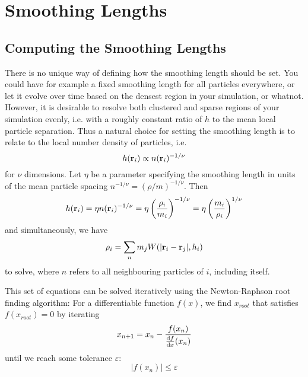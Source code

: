 \newpage
\section{Smoothing Lengths}\label{chap:smoothing_length}


\subsection{Computing the Smoothing Lengths}



There is no unique way of defining how the smoothing length should be set.
You could have for example a fixed smoothing length for all particles everywhere, or let it evolve over time based on the densest region in your simulation, or whatnot.
However, it is desirable to resolve both clustered and sparse regions of your simulation evenly, i.e. with a roughly constant ratio of $h$ to the mean local particle separation.
Thus a natural choice for setting the smoothing length is to relate to the local number density of particles, i.e.
\begin{equation}
	h(\mathbf{r}_i) \propto n(\mathbf{r}_i) ^ {-1/\nu}
\end{equation}
for $\nu$ dimensions.
Let $\eta$ be a parameter specifying the smoothing length in units of the mean particle spacing $n ^ {-1/\nu} = (\rho/m) ^ {-1/\nu}$.
Then
\begin{equation}
	h(\mathbf{r}_i) = \eta n(\mathbf{r}_i) ^ {-1/\nu} = \eta \left(\frac{\rho_i}{m_i}\right) ^ {-1/\nu} = \eta \left(\frac{m_i}{\rho_i}\right) ^ {1/\nu}
\end{equation}
and simultaneously, we have
\begin{equation}
	\rho_i = \sum_{n} m_j W(|\R_i - \R_j|, h_i)
\end{equation}
to solve, where $n$ refers to all neighbouring particles of $i$, including itself.

This set of equations can be solved iteratively using the Newton-Raphson root finding algorithm:
For a differentiable function $f(x)$, we find $x_{root}$ that satisfies $f(x_{root}) = 0$ by iterating
\begin{equation}
	x_{n+1} = x_{n} - \frac{f(x_n)}{\frac{\mathrm{d} f}{\mathrm{d} x}(x_n)}
\end{equation}
until we reach some tolerance $\varepsilon$:
\begin{equation}
	|f(x_n)| \leq \varepsilon
\end{equation}


